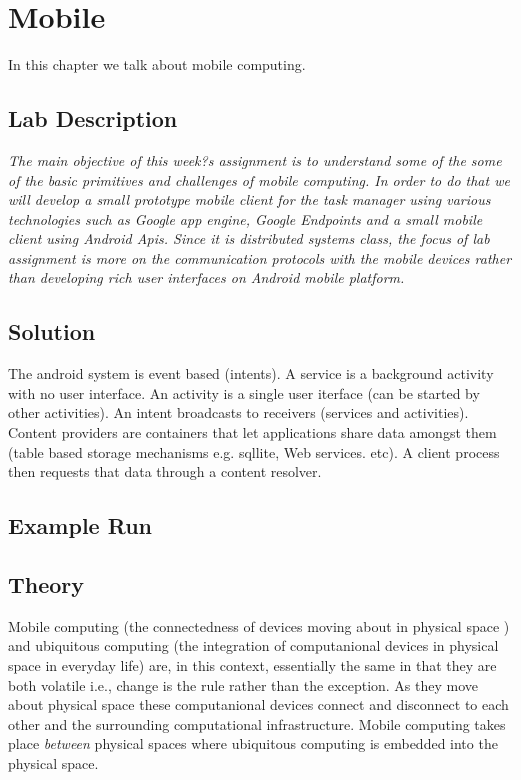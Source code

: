 \chapter{Mobile}
\minitoc

In this chapter we talk about mobile computing. 

\section{Lab Description}

\textit{The main objective of this week?s assignment is to understand some of the some of the basic primitives and challenges of mobile computing. In order to do that we will develop a small prototype mobile client for the task manager using various technologies such as Google app engine, Google Endpoints and a small mobile client using  Android Apis. Since it is distributed systems class, the focus of lab assignment is more on the communication protocols with the mobile devices rather than developing rich user interfaces on Android mobile platform.}

\section{Solution}

The android system is event based (intents). A service is a background activity with no user interface. An activity is a single user iterface (can be started by other activities). An intent broadcasts to receivers (services and activities). Content providers are containers that let applications share data amongst them (table based storage mechanisms e.g. sqllite, Web services. etc). A client process then requests that data through a content resolver. 


\section{Example Run}


\section{Theory}

Mobile computing (the connectedness of devices moving about in physical space ) and ubiquitous computing (the integration of computanional devices in physical space in everyday life) are, in this context, essentially the same in that they are both volatile i.e., change is the rule rather than the exception. As they move about physical space these computanional devices connect and disconnect to each other and the surrounding computational infrastructure. Mobile computing takes place \textit{between} physical spaces where ubiquitous computing is embedded into the physical space. \\

